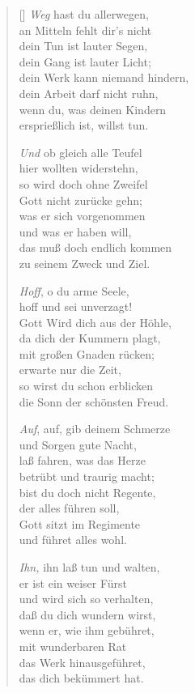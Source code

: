\begin{multicols}{2}
\begin{verse}[\versewidth]
   \emph{Weg} hast du allerwegen,\\
  an Mitteln fehlt dir's nicht\\
  dein Tun ist lauter Segen,\\
  dein Gang ist lauter Licht;\\
  dein Werk kann niemand hindern,\\
  dein Arbeit darf nicht ruhn,\\
  wenn du, was deinen Kindern\\
  ersprießlich ist, willst tun.

   \emph{Und} ob gleich alle Teufel\\
  hier wollten widerstehn,\\
  so wird doch ohne Zweifel\\
  Gott nicht zurücke gehn;\\
  was er sich vorgenommen\\
  und was er haben will,\\
  das muß doch endlich kommen\\
  zu seinem Zweck und Ziel.

   \emph{Hoff}, o du arme Seele,\\
  hoff und sei unverzagt!\\
  Gott Wird dich aus der Höhle,\\
  da dich der Kummern plagt,\\
  mit großen Gnaden rücken;\\
  erwarte nur die Zeit,\\
  so wirst du schon erblicken\\
  die Sonn der schönsten Freud.

   \emph{Auf}, auf, gib deinem Schmerze\\
  und Sorgen gute Nacht,\\
  laß fahren, was das Herze\\
  betrübt und traurig macht;\\
  bist du doch nicht Regente,\\
  der alles führen soll,\\
  Gott sitzt im Regimente\\
  und führet alles wohl.

   \emph{Ihn,} ihn laß tun und walten,\\
  er ist ein weiser Fürst\\
  und wird sich so verhalten,\\
  daß du dich wundern wirst,\\
  wenn er, wie ihm gebühret,\\
  mit wunderbaren Rat\\
  das Werk hinausgeführet,\\
  das dich bekümmert hat.


\end{verse}
\end{multicols}
